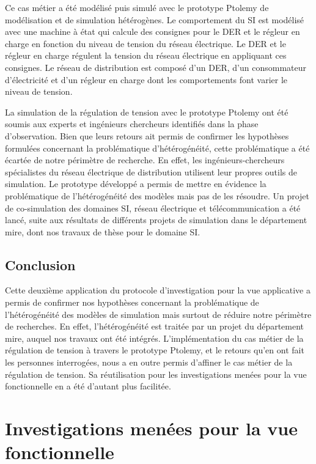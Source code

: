 		Ce cas métier a été modélisé puis simulé avec le prototype Ptolemy de modélisation et de simulation hétérogènes. Le comportement du SI est modélisé avec une machine à état qui calcule des consignes pour le DER et le régleur en charge en fonction du niveau de tension du réseau électrique. Le DER et le régleur en charge  régulent la tension du réseau électrique en appliquant ces consignes. Le réseau de distribution est composé d'un DER, d'un consommateur d'électricité et d'un régleur en charge dont les comportements font varier le niveau de tension.
		
		La simulation de la régulation de tension avec le prototype Ptolemy ont été soumis aux experts et ingénieurs chercheurs identifiés dans la phase d'observation. Bien que leurs retours ait permis de confirmer les hypothèses formulées concernant la problématique d'hétérogénéité, cette problématique a été écartée de notre périmètre de recherche. En effet, les ingénieurs-chercheurs spécialistes du réseau électrique de distribution utilisent leur propres outils de simulation. Le prototype développé a permis de mettre en évidence la problématique de l'hétérogénéité des modèles mais pas de les résoudre. Un projet de co-simulation des domaines SI, réseau électrique et télécommunication a été lancé, suite aux résultats de différents projets de simulation dans le département \gls{mire}, dont nos travaux de thèse pour le domaine SI.
		
		  
				\subsection{Conclusion}
		Cette deuxième application du protocole d'investigation pour la vue applicative a permis de confirmer nos hypothèses concernant la problématique de l'hétérogénéité des modèles de simulation mais surtout de réduire notre périmètre de recherches. En effet, l'hétérogénéité est traitée par un projet du département \gls{mire}, auquel nos travaux ont été intégrés. L'implémentation du cas métier de la régulation de tension à travers le prototype Ptolemy, et le retours qu'en ont fait les personnes interrogées, nous a en outre permis d'affiner le cas métier de la régulation de tension. Sa réutilisation pour les investigations menées pour la vue fonctionnelle en a été d'autant plus facilitée.   
	
		\section{Investigations menées pour la vue fonctionnelle} 
		\label{sec:exploration_fonctionnelle}

